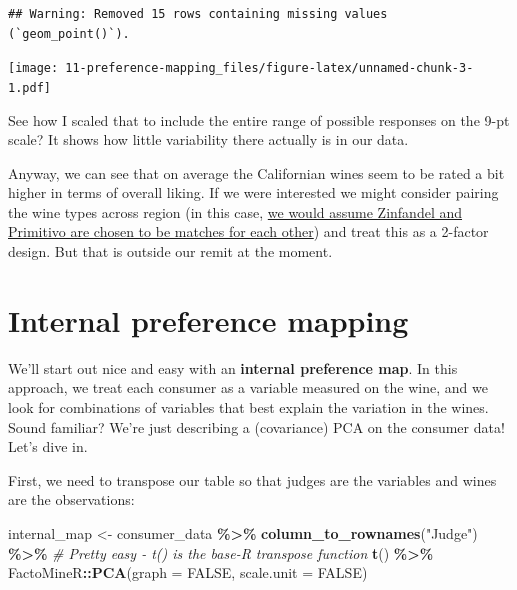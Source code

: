 \documentclass[
]{book}
\newenvironment{Shaded}{\begin{snugshade}}{\end{snugshade}}
\newcommand{\AttributeTok}[1]{\textcolor[rgb]{0.13,0.29,0.53}{#1}}
\newcommand{\CommentTok}[1]{\textcolor[rgb]{0.56,0.35,0.01}{\textit{#1}}}
\newcommand{\ConstantTok}[1]{\textcolor[rgb]{0.56,0.35,0.01}{#1}}
\newcommand{\FunctionTok}[1]{\textcolor[rgb]{0.13,0.29,0.53}{\textbf{#1}}}
\newcommand{\NormalTok}[1]{#1}
\newcommand{\OtherTok}[1]{\textcolor[rgb]{0.56,0.35,0.01}{#1}}
\newcommand{\SpecialCharTok}[1]{\textcolor[rgb]{0.81,0.36,0.00}{\textbf{#1}}}
\newcommand{\StringTok}[1]{\textcolor[rgb]{0.31,0.60,0.02}{#1}}
\begin{document}
\begin{verbatim}
## Warning: Removed 15 rows containing missing values (`geom_point()`).
\end{verbatim}

\texttt{[image: 11-preference-mapping\_files/figure-latex/unnamed-chunk-3-1.pdf]}

See how I scaled that to include the entire range of possible responses on the 9-pt scale? It shows how little variability there actually is in our data.

Anyway, we can see that on average the Californian wines seem to be rated a bit higher in terms of overall liking. If we were interested we might consider pairing the wine types across region (in this case, \href{https://en.wikipedia.org/wiki/Zinfandel}{we would assume Zinfandel and Primitivo are chosen to be matches for each other}) and treat this as a 2-factor design. But that is outside our remit at the moment.

\section{Internal preference mapping}\label{internal-preference-mapping}

We'll start out nice and easy with an \textbf{internal preference map}. In this approach, we treat each consumer as a variable measured on the wine, and we look for combinations of variables that best explain the variation in the wines. Sound familiar? We're just describing a (covariance) PCA on the consumer data! Let's dive in.

First, we need to transpose our table so that judges are the variables and wines are the observations:

\begin{Shaded}
\begin{Highlighting}[]
\NormalTok{internal\_map }\OtherTok{\textless{}{-}} 
\NormalTok{  consumer\_data }\SpecialCharTok{\%\textgreater{}\%}
  \FunctionTok{column\_to\_rownames}\NormalTok{(}\StringTok{"Judge"}\NormalTok{) }\SpecialCharTok{\%\textgreater{}\%}
  \CommentTok{\# Pretty easy {-} \textasciigrave{}t()\textasciigrave{} is the base{-}\textasciigrave{}R\textasciigrave{} transpose function}
  \FunctionTok{t}\NormalTok{() }\SpecialCharTok{\%\textgreater{}\%}
\NormalTok{  FactoMineR}\SpecialCharTok{::}\FunctionTok{PCA}\NormalTok{(}\AttributeTok{graph =} \ConstantTok{FALSE}\NormalTok{, }\AttributeTok{scale.unit =} \ConstantTok{FALSE}\NormalTok{)}
\end{Highlighting}
\end{Shaded}
\end{document}

